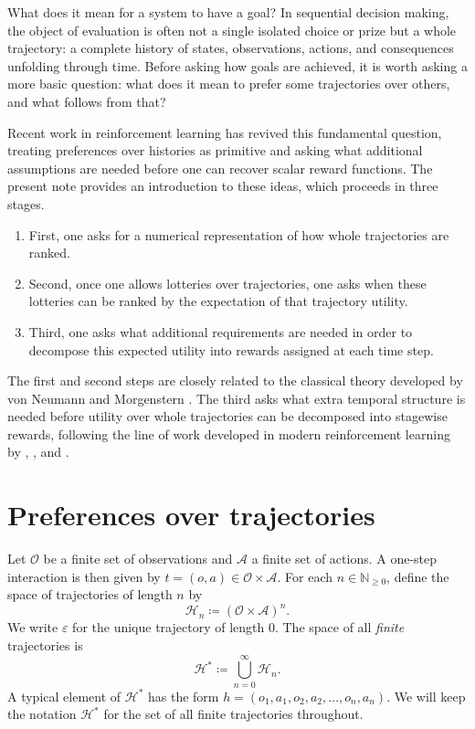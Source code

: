 \documentclass[11pt]{article}
\newcommand{\Hcal}{\mathcal{H}}
\newcommand{\Ofin}{\mathcal{O}}
\newcommand{\Afin}{\mathcal{A}}
\newcommand{\emptytraj}{\varepsilon}
\begin{document}
What does it mean for a system to have a goal? In sequential decision making,
the object of evaluation is often not a single isolated choice or prize but a
whole trajectory: a complete history of states, observations, actions, and
consequences unfolding
through time. Before asking how goals are achieved, it is worth asking a more
basic question: what does it mean to prefer some trajectories over
others, and what follows from that?

Recent work in reinforcement learning has revived this fundamental question,
treating preferences over histories as primitive and asking what additional
assumptions are needed before one can recover scalar reward functions. The
present note provides an introduction to these ideas, which proceeds in three
stages.
\begin{enumerate}[label=(\arabic*)]
    \item First, one asks for a numerical representation of how whole
    trajectories are ranked.
    \item Second, once one allows lotteries over trajectories, one asks when
    these lotteries can be ranked by the expectation of that trajectory
    utility.
    \item Third, one asks what additional requirements are needed in order to
    decompose this expected utility into rewards assigned at each time step.
\end{enumerate}
The first and second steps are closely related to the classical theory developed
by von Neumann and Morgenstern \citep{vonneumann1944theory}. The third asks
what extra temporal structure is needed before utility over whole trajectories
can be decomposed into stagewise rewards, following the line of work developed
in modern reinforcement learning by \citet{pitis2019rethinking},
\citet{shakerinava2022utility}, and \citet{bowling2023settling}.

\section{Preferences over trajectories}

Let $\Ofin$ be a finite set of
observations and $\Afin$ a finite set of actions. A one-step interaction is
then given by $t=(o,a)\in \Ofin\times \Afin$. 
For each $n\in\mathbb{N}_{\geq 0}$, define the space of trajectories of length
$n$ by
\[
\Hcal_n \coloneqq (\Ofin\times \Afin)^n.
\]
We write $\emptytraj$ for the unique trajectory of length $0$. The space of all
\emph{finite} trajectories is
\[
\Hcal^* \coloneqq \bigcup_{n=0}^\infty \Hcal_n.
\]
A typical element of $\Hcal^*$ has the form $h=(o_1,a_1,o_2,a_2,\dots,o_n,a_n)$.
We will keep the notation $\Hcal^*$ for the set of all finite trajectories
throughout.
\end{document}
